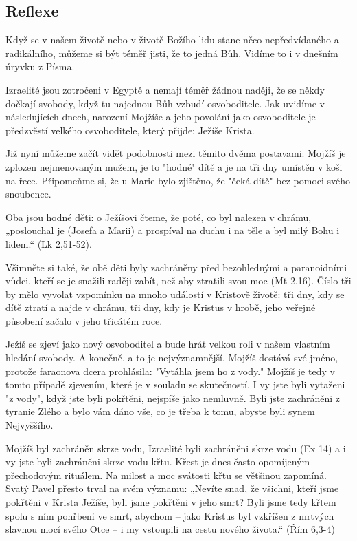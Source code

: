 \documentclass[11pt]{article}
\begin{document}
\subsection*{Reflexe}

Když se v našem životě nebo v životě Božího lidu stane něco nepředvídaného a radikálního, můžeme si být téměř jisti, že to jedná Bůh. Vidíme to i v dnešním úryvku z Písma.

Izraelité jsou zotročeni v Egyptě a nemají téměř žádnou naději, že se někdy dočkají svobody, když tu najednou Bůh vzbudí osvoboditele. Jak uvidíme v následujících dnech, narození Mojžíše a jeho povolání jako osvoboditele je předzvěstí velkého osvoboditele, který přijde: Ježíše Krista.

Již nyní můžeme začít vidět podobnosti mezi těmito dvěma postavami:
Mojžíš je zplozen nejmenovaným mužem, je to "hodné" dítě a je na tři dny umístěn v koši na řece. Připomeňme si, že u Marie bylo zjištěno, že "čeká dítě" bez pomoci svého snoubence.

Oba jsou hodné děti: o Ježíšovi čteme, že poté, co byl nalezen v chrámu, „poslouchal je (Josefa a Marii) a prospíval na duchu i na těle a byl milý Bohu i lidem.“ (Lk 2,51-52).

Všimněte si také, že obě děti byly zachráněny před bezohlednými a paranoidními vůdci, kteří se je snažili raději zabít, než aby ztratili svou moc (Mt 2,16).
Číslo tři by mělo vyvolat vzpomínku na mnoho událostí v Kristově životě: tři dny, kdy se dítě ztratí a najde v chrámu, tři dny, kdy je Kristus v hrobě, jeho veřejné působení začalo v jeho třicátém roce.

Ježíš se zjeví jako nový osvoboditel a bude hrát velkou roli v našem vlastním hledání svobody.
A konečně, a to je nejvýznamnější, Mojžíš dostává své jméno, protože faraonova dcera prohlásila: "Vytáhla jsem ho z vody." Mojžíš je tedy v tomto případě zjevením, které je v souladu se skutečností. I vy jste byli vytaženi "z vody", když jste byli pokřtěni, nejspíše jako nemluvně. Byli jste zachráněni z tyranie Zlého a bylo vám dáno vše, co je třeba k tomu, abyste byli synem Nejvyššího.

Mojžíš byl zachráněn skrze vodu, Izraelité byli zachráněni skrze vodu (Ex 14) a i vy jste byli zachráněni skrze vodu křtu.
Křest je dnes často opomíjeným přechodovým rituálem. Na milost a moc svátosti křtu se většinou zapomíná. Svatý Pavel přesto trval na svém významu: „Nevíte snad, že všichni, kteří jsme pokřtěni v Krista Ježíše, byli jsme pokřtěni v jeho smrt? Byli jsme tedy křtem spolu s ním pohřbeni ve smrt, abychom – jako Kristus byl vzkříšen z mrtvých slavnou mocí svého Otce – i my vstoupili na cestu nového života.“ (Řím 6,3-4)
\end{document}
